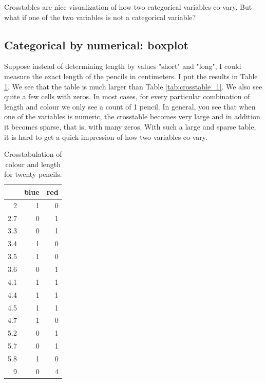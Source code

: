 \documentclass[]{book}\usepackage[]{graphicx}\usepackage[]{color}
\begin{document}
Crosstables are nice visualization of how two categorical variables co-vary. But what if one of the two variables is not a categorical variable?


\subsection{Categorical by numerical: boxplot}
Suppose instead of determining length by values "short" and "long", I could measure the exact length of the pencils in centimeters. I put the results in Table \ref{tab:crosstable_2}. We see that the table is much larger than Table \ref{tab:crosstable_1}. We also see quite a few cells with zeros. In most cases, for every particular combination of length and colour we only see a count of 1 pencil. In general, you see that when one of the variables is numeric, the crosstable becomes very large and in addition it becomes sparse, that is, with many zeros. With such a large and sparse table, it is hard to get a quick impression of how two variables co-vary.

\begin{table}[ht]
\centering
\caption{Crosstabulation of colour and length for twenty pencils.} 
\label{tab:crosstable_2}
\begin{tabular}{rrr}
  \hline
 & blue & red \\ 
  \hline
2 &   1 &   0 \\ 
  2.7 &   0 &   1 \\ 
  3.3 &   0 &   1 \\ 
  3.4 &   1 &   0 \\ 
  3.5 &   1 &   0 \\ 
  3.6 &   0 &   1 \\ 
  4.1 &   1 &   1 \\ 
  4.4 &   1 &   1 \\ 
  4.5 &   1 &   1 \\ 
  4.7 &   1 &   0 \\ 
  5.2 &   0 &   1 \\ 
  5.7 &   0 &   1 \\ 
  5.8 &   1 &   0 \\ 
  9 &   0 &   4 \\ 
   \hline
\end{tabular}
\end{table}
\end{document}
